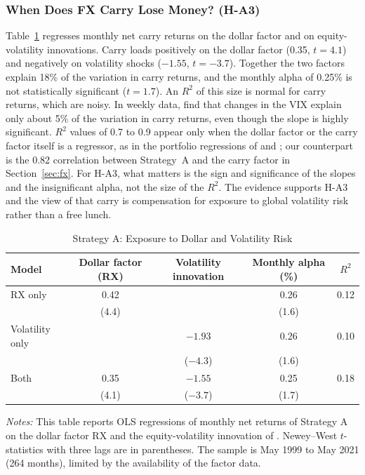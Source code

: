 \documentclass[11pt]{article}
\newcommand{\tabnote}[1]{\par\vspace{0.3em}\begin{minipage}{\linewidth}\footnotesize\setstretch{1.0}\textit{Notes:} #1\end{minipage}}
\begin{document}
\subsubsection{When Does FX Carry Lose Money? (H-A3)}

Table~\ref{tab:Areg} regresses monthly net carry returns on the dollar factor and on equity-volatility innovations. Carry loads positively on the dollar factor (0.35, $t=4.1$) and negatively on volatility shocks ($-1.55$, $t=-3.7$). Together the two factors explain 18\% of the variation in carry returns, and the monthly alpha of 0.25\% is not statistically significant ($t=1.7$). An $R^2$ of this size is normal for carry returns, which are noisy. In weekly data, \citet{BrunnermeierNagelPedersen2008} find that changes in the VIX explain only about 5\% of the variation in carry returns, even though the slope is highly significant. $R^2$ values of 0.7 to 0.9 appear only when the dollar factor or the carry factor itself is a regressor, as in the portfolio regressions of \citet{LRV2011} and \citet{Menkhoff2012}; our counterpart is the 0.82 correlation between Strategy~A and the carry factor in Section~\ref{sec:fx}. For H-A3, what matters is the sign and significance of the slopes and the insignificant alpha, not the size of the $R^2$. The evidence supports H-A3 and the view of \citet{Menkhoff2012} that carry is compensation for exposure to global volatility risk rather than a free lunch.

\begin{table}[!htbp]
\centering
\caption{Strategy A: Exposure to Dollar and Volatility Risk}\label{tab:Areg}
\small
\begin{tabular}{lcccc}
\toprule
Model & Dollar factor (RX) & Volatility innovation & Monthly alpha (\%) & $R^2$ \\
\midrule
RX only & 0.42 & & 0.26 & 0.12 \\
 & (4.4) & & (1.6) & \\
Volatility only & & $-1.93$ & 0.26 & 0.10 \\
 & & ($-4.3$) & (1.6) & \\
Both & 0.35 & $-1.55$ & 0.25 & 0.18 \\
 & (4.1) & ($-3.7$) & (1.7) & \\
\bottomrule
\end{tabular}
\tabnote{This table reports OLS regressions of monthly net returns of Strategy A on the dollar factor RX and the equity-volatility innovation of \citet{LRV2011}. Newey--West $t$-statistics with three lags are in parentheses. The sample is May 1999 to May 2021 (264 months), limited by the availability of the factor data.}
\end{table}
\end{document}
